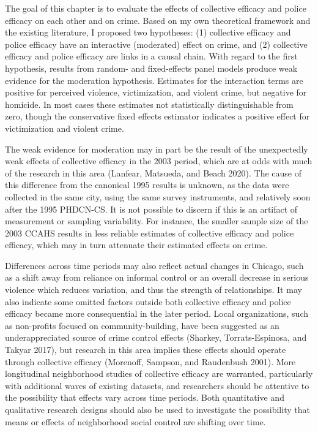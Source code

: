 \documentclass [11pt, proquest] {uwthesis}[2015/03/03]
\begin{document}
The goal of this chapter is to evaluate the effects of collective efficacy and police efficacy on each other and on crime. Based on my own theoretical framework and the existing literature, I proposed two hypotheses: (1) collective efficacy and police efficacy have an interactive (moderated) effect on crime, and (2) collective efficacy and police efficacy are links in a causal chain. With regard to the first hypothesis, results from random- and fixed-effects panel models produce weak evidence for the moderation hypothesis. Estimates for the interaction terms are positive for perceived violence, victimization, and violent crime, but negative for homicide. In most cases these estimates not statistically distinguishable from zero, though the conservative fixed effects estimator indicates a positive effect for victimization and violent crime.

The weak evidence for moderation may in part be the result of the unexpectedly weak effects of collective efficacy in the 2003 period, which are at odds with much of the research in this area (Lanfear, Matsueda, and Beach 2020). The cause of this difference from the canonical 1995 results is unknown, as the data were collected in the same city, using the same survey instruments, and relatively soon after the 1995 PHDCN-CS. It is not possible to discern if this is an artifact of measurement or sampling variability. For instance, the smaller sample size of the 2003 CCAHS results in less reliable estimates of collective efficacy and police efficacy, which may in turn attenuate their estimated effects on crime.

Differences across time periods may also reflect actual changes in Chicago, such as a shift away from reliance on informal control or an overall decrease in serious violence which reduces variation, and thus the strength of relationships. It may also indicate some omitted factors outside both collective efficacy and police efficacy became more consequential in the later period. Local organizations, such as non-profits focused on community-building, have been suggested as an underappreciated source of crime control effects (Sharkey, Torrats-Espinosa, and Takyar 2017), but research in this area implies these effects should operate through collective efficacy (Morenoff, Sampson, and Raudenbush 2001). More longitudinal neighborhood studies of collective efficacy are warranted, particularly with additional waves of existing datasets, and researchers should be attentive to the possibility that effects vary across time periods. Both quantitative and qualitative research designs should also be used to investigate the possibility that means or effects of neighborhood social control are shifting over time.
\end{document}
